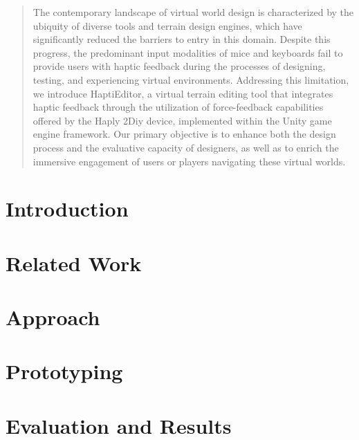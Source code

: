 \documentclass[manuscript,screen,review, nonacm=true]{acmart}
\begin{document}


\begin{abstract}
The contemporary landscape of virtual world design is characterized by the ubiquity of diverse tools and terrain design engines, which have significantly reduced the barriers to entry in this domain. Despite this progress, the predominant input modalities of mice and keyboards fail to provide users with haptic feedback during the processes of designing, testing, and experiencing virtual environments. Addressing this limitation, we introduce HaptiEditor, a virtual terrain editing tool that integrates haptic feedback through the utilization of force-feedback capabilities offered by the Haply 2Diy device, implemented within the Unity game engine framework. Our primary objective is to enhance both the design process and the evaluative capacity of designers, as well as to enrich the immersive engagement of users or players navigating these virtual worlds.  
\end{abstract}


\maketitle

\section{Introduction} \label{sec:intro}


\section{Related Work} \label{sec:rel_work}


\section{Approach} \label{sec:approach}


\section{Prototyping} \label{sec:prototyping}


\section{Evaluation and Results} \label{sec:evaluation}

\end{document}
